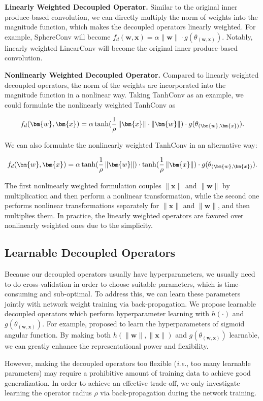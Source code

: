 \textbf{Linearly Weighted Decoupled Operator.} Similar to the original inner produce-based convolution, we can directly multiply the norm of weights into the magnitude function, which makes the decoupled operators linearly weighted. For example, SphereConv will become $f_d(\bm{w},\bm{x}) = \alpha\|\bm{w}\|\cdot g(\theta_{(\bm{w},\bm{x})})$. Notably, linearly weighted LinearConv will become the original inner produce-based convolution.
\par

\textbf{Nonlinearly Weighted Decoupled Operator.} Compared to linearly weighted decoupled operators, the norm of the weights are incorporated into the magnitude function in a nonlinear way. Taking TanhConv as an example, we could formulate the nonlinearly weighted TanhConv as

\begin{equation}\label{eq:nwdov1}
\small
    f_d(\bm{w},\bm{x}) = \alpha\tanh(\frac{1}{\rho}\left\lVert\bm{x}\right\rVert\cdot\left\lVert\bm{w}\right\rVert)\cdot g(\theta_{(\bm{w},\bm{x})}).
\end{equation}

We can also formulate the nonlinearly weighted TanhConv in an alternative way:

\begin{equation}\label{eq:nwdov2}
\small
f_d(\bm{w},\bm{x}) = \alpha\tanh(\frac{1}{\rho}\left\lVert\bm{w}\right\rVert)\cdot\tanh(\frac{1}{\rho}\left\lVert\bm{x}\right\rVert)\cdot g(\theta_{(\bm{w},\bm{x})}).
\end{equation}

The first nonlinearly weighted formulation couples $\|\bm{x}\|$ and $\|\bm{w}\|$ by multiplication and then perform a nonlinear transformation, while the second one performs nonlinear transformations separately for $\|\bm{x}\|$ and $\|\bm{w}\|$, and then multiplies them. In practice, the linearly weighted operators are favored over nonlinearly weighted ones due to the simplicity.
\subsection{Learnable Decoupled Operators} Because our decoupled operators usually have hyperparameters, we usually need to do cross-validation in order to choose suitable parameters, which is time-consuming and sub-optimal. To address this, we can learn these parameters jointly with network weight training via back-propagation.  We propose learnable decoupled operators which perform hyperparameter learning with $h(\cdot)$ and $g(\theta_{(\bm{w},\bm{x})})$. For example, \cite{liu2017deephyper} proposed to learn the hyperparameters of sigmoid angular function. By making both $h(\|\bm{w}\|,\|\bm{x}\|)$ and $g(\theta_{(\bm{w},\bm{x})})$ learnable, we can greatly enhance the representational power and flexibility.
\par
However, making the decoupled operators too flexible (\emph{i.e.}, too many learnable parameters) may require a prohibitive amount of training data to achieve good generalization. In order to achieve an effective trade-off, we only investigate learning the operator radius $\rho$ via back-propagation during the network training.

